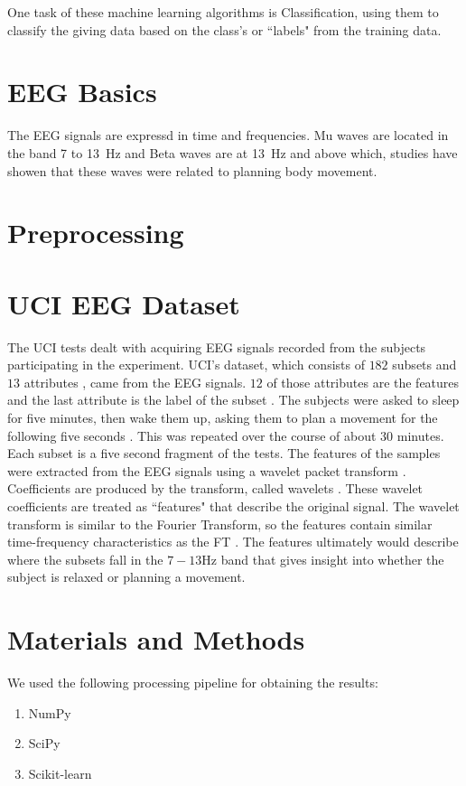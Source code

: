 \documentclass[conference,compsoc]{IEEEtran}
\begin{document}
One task of these machine learning algorithms is Classification, using them to classify the giving data based on the class's or ``labels" from the training data. 
\section{EEG Basics}
The EEG signals are expressd in time and frequencies.  Mu waves are located in the band 7 to \SI{13}{\hertz} and Beta waves are at \SI{13}{\hertz} and above \cite{classsvm} which, studies have showen that these waves were related to planning body movement.
\section{Preprocessing}
\section{UCI EEG Dataset}
The UCI tests dealt with acquiring EEG signals recorded from the subjects participating in the experiment.  UCI's dataset, which consists of $182$ subsets and $13$ attributes \cite{classsvm}, came from the EEG signals. $12$ of those attributes are the features and the last attribute is the label of the subset \cite{online}. 
The subjects were asked to sleep for five minutes, then 
wake them up, asking them to plan a movement for the following five seconds \cite{classsvm}. This was repeated over the course of about 30 minutes. Each subset is a five second fragment of the tests. The features of the samples were extracted from the EEG signals using a wavelet packet transform \cite{online}. 
Coefficients are produced by the transform, called wavelets \cite{wavelet}. These wavelet coefficients are treated as ``features" that describe the original signal.
The wavelet transform is similar to the Fourier Transform, so the features contain similar time-frequency characteristics as the FT \cite{packet}. 
The features ultimately would describe where the subsets fall in the $7-13\si{\hertz}$ band that gives insight into whether the subject is relaxed or planning a movement.

\section{Materials and Methods}
We used the following processing pipeline for obtaining the results:
\begin{enumerate}
\item NumPy
\item SciPy
\item Scikit-learn
\end{enumerate}
\end{document}
